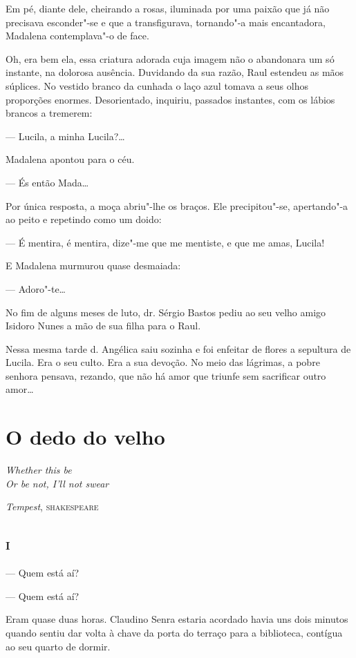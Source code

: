 Em pé, diante dele, cheirando a rosas, iluminada por uma paixão que já
não precisava esconder"-se e que a transfigurava, tornando"-a mais
encantadora, Madalena contemplava"-o de face.

Oh, era bem ela, essa criatura adorada cuja imagem não o abandonara um
só instante, na dolorosa ausência. Duvidando da sua razão, Raul estendeu
as mãos súplices. No vestido branco da cunhada o laço azul tomava a seus
olhos proporções enormes. Desorientado, inquiriu, passados instantes,
com os lábios brancos a tremerem:

--- Lucila, a minha Lucila?\ldots{}

Madalena apontou para o céu.

--- És então Mada\ldots{}

Por única resposta, a moça abriu"-lhe os braços. Ele precipitou"-se,
apertando"-a ao peito e repetindo como um doido:

--- É mentira, é mentira, dize"-me que me mentiste, e que me amas,
Lucila!

E Madalena murmurou quase desmaiada:

--- Adoro"-te\ldots{}

\asterisc

No fim de alguns meses de luto, dr. Sérgio Bastos pediu ao seu velho
amigo Isidoro Nunes a mão de sua filha para o Raul.

Nessa mesma tarde d. Angélica saiu sozinha e foi enfeitar de flores a
sepultura de Lucila. Era o seu culto. Era a sua devoção. No meio das
lágrimas, a pobre senhora pensava, rezando, que não há amor que triunfe
sem sacrificar outro amor\ldots{}

\chapter{O dedo do velho}

\epigraph{\textit{Whether this be}\\
\textit{Or be not, I'll not swear}}{\emph{Tempest}, \textsc{shakespeare}}

\section*{\textsc{i}}

--- Quem está aí?

--- Quem está aí?

Eram quase duas horas. Claudino Senra estaria acordado havia uns dois
minutos quando sentiu dar volta à chave da porta do terraço para a
biblioteca, contígua ao seu quarto de dormir.

